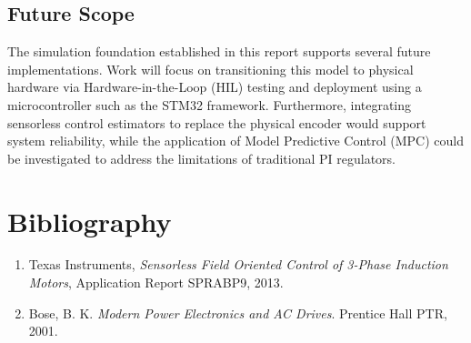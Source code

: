 \documentclass[12pt,a4paper]{report}
\begin{document}
\section{Future Scope}
The simulation foundation established in this report supports several future implementations. Work will focus on transitioning this model to physical hardware via Hardware-in-the-Loop (HIL) testing and deployment using a microcontroller such as the STM32 framework. Furthermore, integrating sensorless control estimators to replace the physical encoder would support system reliability, while the application of Model Predictive Control (MPC) could be investigated to address the limitations of traditional PI regulators.

\chapter*{Bibliography}
\begin{enumerate}
    \item Texas Instruments, \textit{Sensorless Field Oriented Control of 3-Phase Induction Motors}, Application Report SPRABP9, 2013.
    \item Bose, B. K. \textit{Modern Power Electronics and AC Drives}. Prentice Hall PTR, 2001.
\end{enumerate}
\end{document}
